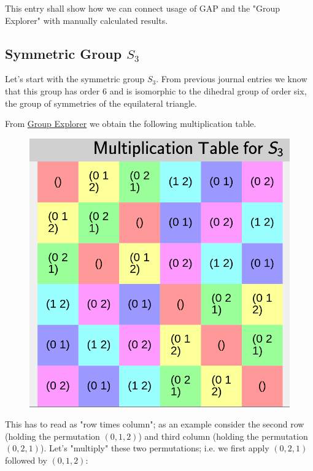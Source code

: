 
This entry shall show how we can connect usage of GAP and the "Group Explorer" with manually calculated results.

\subsection{Symmetric Group $S_3$}

Let's start with the symmetric group $S_3$. From previous journal entries we know that this group has order $6$ and is isomorphic to the dihedral group of order six, the group of symmetries of the equilateral triangle.

From \href{https://nathancarter.github.io/group-explorer/GroupInfo.html?groupURL=https://nathancarter.github.io/group-explorer/groups/S_3.group}{Group Explorer} we obtain the following multiplication table.

\begin{figure}[H]
    \centering
    \includegraphics[scale=0.25]{images/group_gap_01.png}
\end{figure}
    
This has to read as "row times column"; as an example consider the second row (holding the permutation $(0,1,2)$) and third column (holding the permutation $(0,2,1)$). Let's "multiply" these two permutations; i.e. we first apply $(0,2,1)$ followed by $(0,1,2)$:

